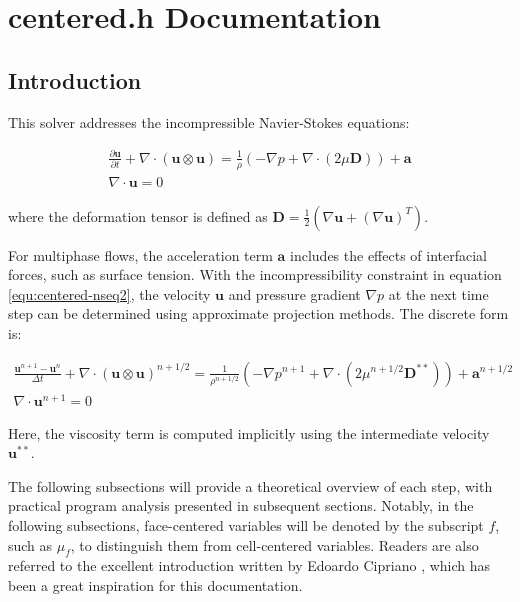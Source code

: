 \chapter{centered.h Documentation}
\ifsingle
\maketitle
\fi
\chaptermeta[1.0][2025-01-01]

\section{Introduction}
This solver addresses the incompressible Navier-Stokes equations\cite{2003_Popinet,2015_Popinet}:

\begin{gather}
    \frac{\partial \mathbf{u}}{\partial t} 
    + \nabla \cdot (\mathbf{u} \otimes \mathbf{u}) 
    = \frac{1}{\rho} \left(-\nabla p + \nabla \cdot (2\mu \mathbf{D})\right) 
    + \mathbf{a}
    \label{equ:centered-nseq1} \\
    \nabla \cdot \mathbf{u} = 0 
    \label{equ:centered-nseq2}
\end{gather}

where the deformation tensor is defined as 
$
\mathbf{D} = \frac{1}{2} (\nabla \mathbf{u} + (\nabla \mathbf{u})^T)
$.

For multiphase flows, the acceleration term $\mathbf{a}$ includes the effects of interfacial forces, such as surface tension. With the incompressibility constraint in equation \ref{equ:centered-nseq2}, the velocity $\mathbf{u}$ and pressure gradient $\nabla p$ at the next time step can be determined using approximate projection methods. The discrete form is:

\begin{gather}
    \frac{\mathbf{u}^{n+1} - \mathbf{u}^n}{\Delta t} 
    + \nabla \cdot (\mathbf{u} \otimes \mathbf{u})^{n+1/2} 
    = \frac{1}{\rho^{n+1/2}} \left(-\nabla p^{n+1} 
    + \nabla \cdot \left(2\mu^{n+1/2} \mathbf{D}^{**}\right)\right) 
    + \mathbf{a}^{n+1/2}
    \label{equ:centered-nseqdes1} \\
    \nabla \cdot \mathbf{u}^{n+1} = 0 \label{equ:centered-nseqdes2}
\end{gather}

Here, the viscosity term is computed implicitly using the intermediate velocity $\mathbf{u}^{**}$.

The following subsections will provide a theoretical overview of each step, with practical program analysis presented in subsequent sections. Notably, in the following subsections, face-centered variables will be denoted by the subscript $f$, such as $\mu_f$, to distinguish them from cell-centered variables. Readers are also referred to the excellent introduction written by Edoardo Cipriano \cite{2024_Cipriano}, which has been a great inspiration for this documentation.

